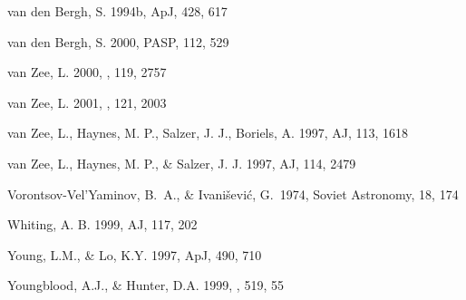 \documentclass[12pt,preprint]{emulateapj}
\begin{document}
\begin{thebibliography}{}
van den Bergh, S. 1994b, ApJ, 428, 617

van den Bergh, S. 2000, PASP, 112, 529

van Zee, L. 2000, \aj , 119, 2757

van Zee, L. 2001, \aj , 121, 2003

van Zee, L., Haynes, M. P., Salzer, J. J., Boriels, A. 1997, AJ, 113, 1618

van Zee, L., Haynes, M. P., \& Salzer, J. J. 1997, AJ, 114, 2479

Vorontsov-Vel'Yaminov, B.~A., \& 
Ivani{\v s}evi{\'c}, G.\ 1974, Soviet Astronomy, 18, 174 

Whiting, A. B. 1999, AJ, 117, 202

Young, L.M., \& Lo, K.Y. 1997, ApJ, 490, 710
 
Youngblood, A.J., \& Hunter, D.A. 1999, \apj , 519, 55

\end{thebibliography}

\clearpage


\end{document}

